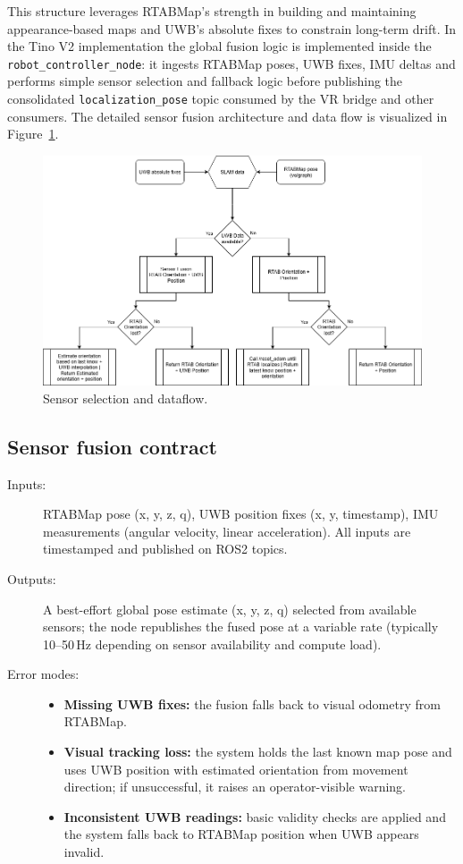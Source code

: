 This structure leverages RTABMap's strength in building and maintaining appearance-based maps and UWB's absolute fixes to constrain long-term drift. In the Tino V2 implementation the global fusion logic is implemented inside the \texttt{robot\_controller\_node}: it ingests RTABMap poses, UWB fixes, IMU deltas and performs simple sensor selection and fallback logic before publishing the consolidated \texttt{localization\_pose} topic consumed by the VR bridge and other consumers. The detailed sensor fusion architecture and data flow is visualized in Figure~\ref{fig-sensor-fusion}.

\begin{figure}[H]
	\centering
	\includegraphics[width=0.85\linewidth]{Images/sensor_fusion.png}
	\caption{Sensor selection and dataflow.}\label{fig-sensor-fusion}
\end{figure}

\subsection*{Sensor fusion contract}
\begin{description}
	\item[Inputs:] RTABMap pose (x, y, z, q), UWB position fixes (x, y, timestamp), IMU measurements (angular velocity, linear acceleration). All inputs are timestamped and published on ROS2 topics.
	\item[Outputs:] A best-effort global pose estimate (x, y, z, q) selected from available sensors; the node republishes the fused pose at a variable rate (typically 10--50\,Hz depending on sensor availability and compute load).
	\item[Error modes:] \begin{itemize}[nosep,leftmargin=*]
		\item \textbf{Missing UWB fixes:} the fusion falls back to visual odometry from RTABMap.
		\item \textbf{Visual tracking loss:} the system holds the last known map pose and uses UWB position with estimated orientation from movement direction; if unsuccessful, it raises an operator-visible warning.
		\item \textbf{Inconsistent UWB readings:} basic validity checks are applied and the system falls back to RTABMap position when UWB appears invalid.
	\end{itemize}
\end{description}

